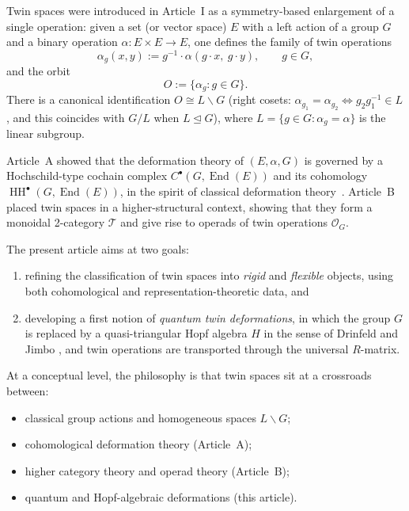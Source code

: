 \documentclass[11pt,a4paper]{article}
\numberwithin{equation}{section}
\DeclareMathOperator{\End}{End}
\DeclareMathOperator{\HH}{HH}
\newcommand{\TwinSpace}{(E,\alpha,G)}
\newcommand{\Twin}{\mathcal{T}}
\newcommand{\TwinOrbit}{O}
\newcommand{\LinearSubgroup}{L}
\newcommand{\Cochain}{C}
\begin{document}
	Twin spaces were introduced in Article~I as a symmetry-based enlargement of a single operation:
	given a set (or vector space) $E$ with a left action of a group $G$ and a binary operation 
	$\alpha:E\times E\to E$, one defines the family of twin operations
	\begin{equation}\label{eq:twin-def-C}
		\alpha_g(x,y) := g^{-1}\cdot \alpha(g\cdot x,\ g\cdot y), \qquad g\in G,
	\end{equation}
	and the orbit
	\[
	\TwinOrbit := \{\alpha_g : g\in G\}.
	\]
	There is a canonical identification $\TwinOrbit \cong \LinearSubgroup\backslash G$ (right cosets: $\alpha_{g_1}=\alpha_{g_2}\iff g_2g_1^{-1}\in\LinearSubgroup$, and this coincides with $G/\LinearSubgroup$ when $\LinearSubgroup\trianglelefteq G$), where 
	$\LinearSubgroup=\{g\in G : \alpha_g=\alpha\}$ is the linear subgroup.
	
	Article~A showed that the deformation theory of $\TwinSpace$ is governed by a Hochschild-type
	cochain complex $\Cochain^\bullet(G,\End(E))$ and its cohomology $\HH^\bullet(G,\End(E))$, in 
	the spirit of classical deformation theory~\cite{Gerstenhaber1964,NijenhuisRichardson1967,Weibel1994}.
	Article~B placed twin spaces in a higher-structural context, showing that they form a monoidal 
	2-category $\Twin$ and give rise to operads of twin operations $\mathcal{O}_G$.
	
	The present article aims at two goals:
	
	\begin{enumerate}[label=(\roman*)]
		\item refining the classification of twin spaces into \emph{rigid} and \emph{flexible} objects,
		using both cohomological and representation-theoretic data, and
		\item developing a first notion of \emph{quantum twin deformations}, in which the group $G$ is
		replaced by a quasi-triangular Hopf algebra $H$ in the sense of Drinfeld and Jimbo
		\cite{Drinfeld1986,Jimbo1985,ChariPressley1994}, and twin operations are transported through
		the universal $R$-matrix.
	\end{enumerate}
	
	At a conceptual level, the philosophy is that twin spaces sit at a crossroads between:
	
	\begin{itemize}
		\item classical group actions and homogeneous spaces $\LinearSubgroup\backslash G$;
		\item cohomological deformation theory (Article~A);
		\item higher category theory and operad theory (Article~B);
		\item quantum and Hopf-algebraic deformations (this article).
	\end{itemize}
	
\end{document}

